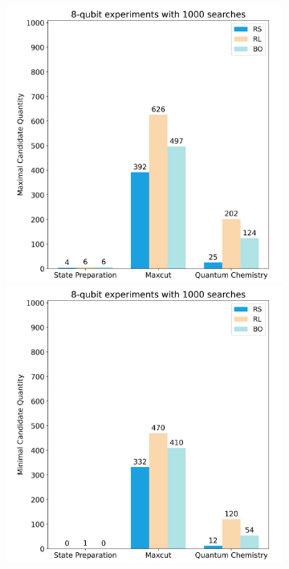 \documentclass{article} %
\begin{document}
\begin{figure}[htbp]
\begin{subfigure}[b]{0.48\textwidth}
\begin{minipage}[b]{0.7\textwidth}
        \end{minipage}
        \hspace{-1em}
        \begin{minipage}[b]{0.28\textwidth}
            \centering
            \includegraphics[width=\textwidth]{images/8-qubits_experiments_candidates_max.png}
            \includegraphics[width=\textwidth]{images/8-qubits_experiments_candidates_min.png}  %

\end{minipage}
\end{subfigure}
\end{figure}
\end{document}
